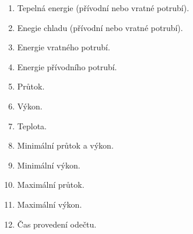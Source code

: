	\begin{enumerate}
		\item Tepelná energie (přívodní nebo vratné potrubí).
		\item Enegie chladu (přívodní nebo vratné potrubí).
		\item Energie vratného potrubí.
		\item Energie přívodního potrubí.
		\item Průtok.
		\item Výkon.
		\item Teplota.
		\item Minimální průtok a výkon.
		\item Minimální výkon.
		\item Maximální průtok.
		\item Maximální výkon.
		\item Čas provedení odečtu.
	\end{enumerate}

